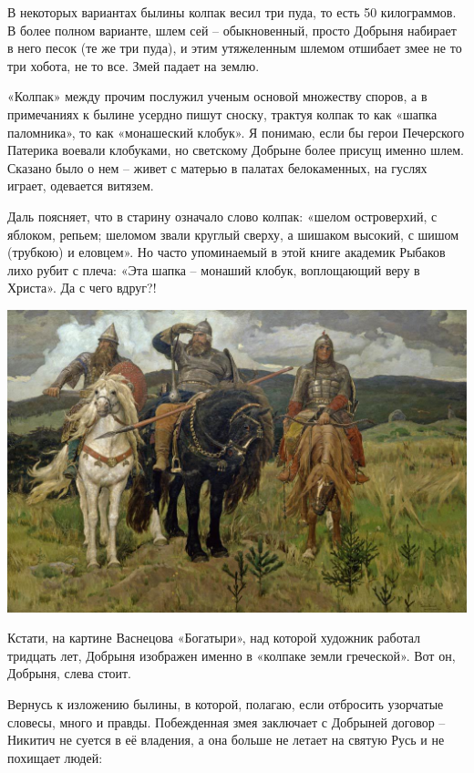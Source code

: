 В некоторых вариантах былины колпак весил три пуда, то есть 50 килограммов. В более полном варианте, шлем сей – обыкновенный, просто Добрыня набирает в него песок (те же три пуда), и этим утяжеленным шлемом отшибает змее не то три хобота, не то все. Змей падает на землю.

«Колпак» между прочим послужил ученым основой множеству споров, а в примечаниях к былине усердно пишут сноску, трактуя колпак то как «шапка паломника», то как «монашеский клобук». Я понимаю, если бы герои Печерского Патерика воевали клобуками, но светскому Добрыне более присущ именно шлем. Сказано было о нем – живет с матерью в палатах белокаменных, на гуслях играет, одевается витязем.

Даль поясняет, что в старину означало слово колпак: «шелом островерхий, с яблоком, репьем; шеломом звали  круглый  сверху, а шишаком высокий, с шишом (трубкою) и еловцем». Но часто упоминаемый в этой книге академик Рыбаков лихо рубит с плеча: «Эта шапка – монаший клобук, воплощающий веру в Христа». Да с чего вдруг?!

\begin{center}
\includegraphics[width=\linewidth]{chast-zmiy/dobrynya/tri-bog-02.jpg}
\end{center}

Кстати, на картине Васнецова «Богатыри», над которой художник работал тридцать лет, Добрыня изображен именно в «колпаке земли греческой». Вот он, Добрыня, слева стоит.

Вернусь к изложению былины, в которой, полагаю, если отбросить узорчатые словесы, много и правды. Побежденная змея заключает с Добрыней договор – Никитич не суется в её владения, а она больше не летает на святую Русь и не похищает людей:

